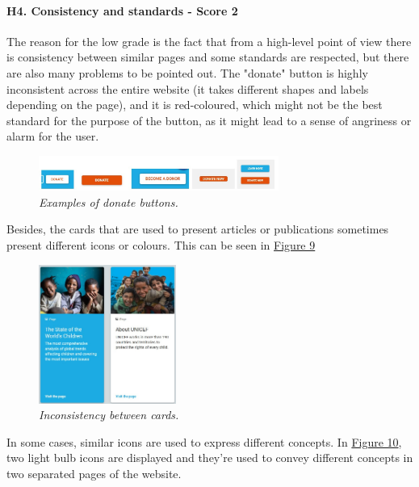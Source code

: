 \paragraph{H4. Consistency and standards - Score 2} \label{subsec:H4}	The reason for the low grade is the fact that from a high-level point of view there is consistency between similar pages and some standards are respected, but there are also many problems to be pointed out.
\newline The "donate" button is highly inconsistent across the entire website (it takes different shapes and labels depending on the page), and it is red-coloured, which might not be the best standard for the purpose of the button, as it might lead to a sense of angriness or alarm for the user.
\begin{figure}[!h]
	\begin{center}
		\includegraphics[width=0.7\textwidth]{FinalScores8.jpg}
		\captionsetup{font=small}
		\caption{\textit{Examples of donate buttons.}}
	\end{center}
\end{figure}
\newline Besides, the cards that are used to present articles or publications sometimes present different icons or colours. This can be seen in \hyperref[fig:cards]{Figure 9}
\begin{figure}[!h]
	\label{fig:cards}
	\begin{center}
		\includegraphics[width=0.4\textwidth]{FinalScores9.jpg}
		\captionsetup{font=small}
		\caption{\textit{Inconsistency between cards.}}
	\end{center}
\end{figure}

In some cases, similar icons are used to express different concepts. In \hyperref[fig:fig10]{Figure 10}, two light bulb icons are displayed and they're used to convey different concepts in two separated pages of the website.



